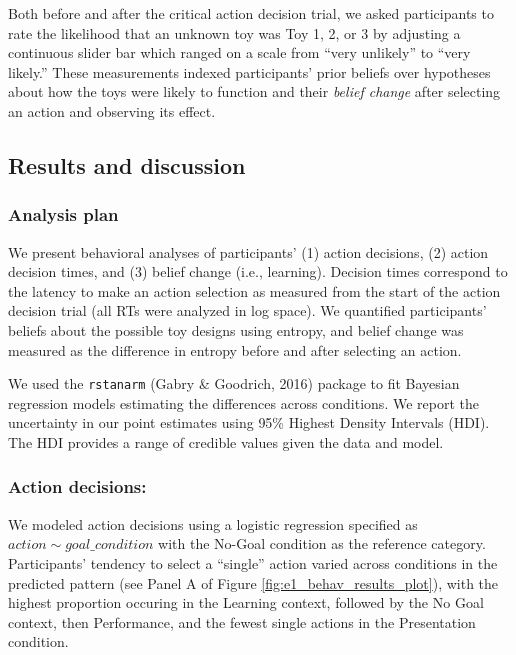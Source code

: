 \documentclass[10pt, letterpaper]{article}
\begin{document}
Both before and after the critical action decision trial, we asked
participants to rate the likelihood that an unknown toy was Toy 1, 2, or
3 by adjusting a continuous slider bar which ranged on a scale from
``very unlikely'' to ``very likely.'' These measurements indexed
participants' prior beliefs over hypotheses about how the toys were
likely to function and their \emph{belief change} after selecting an
action and observing its effect.

\subsection{Results and discussion}\label{results-and-discussion}

\subsubsection{Analysis plan}\label{analysis-plan}

We present behavioral analyses of participants' (1) action decisions,
(2) action decision times, and (3) belief change (i.e., learning).
Decision times correspond to the latency to make an action selection as
measured from the start of the action decision trial (all RTs were
analyzed in log space). We quantified participants' beliefs about the
possible toy designs using entropy, and belief change was measured as
the difference in entropy before and after selecting an action.

We used the \texttt{rstanarm} (Gabry \& Goodrich, 2016) package to fit
Bayesian regression models estimating the differences across conditions.
We report the uncertainty in our point estimates using 95\% Highest
Density Intervals (HDI). The HDI provides a range of credible values
given the data and model.

\subsubsection{Action decisions:}\label{action-decisions}

We modeled action decisions using a logistic regression specified as
\texttt{$action \sim goal\_condition$} with the No-Goal condition as the
reference category. Participants' tendency to select a ``single'' action
varied across conditions in the predicted pattern (see Panel A of Figure
\ref{fig:e1_behav_results_plot}), with the highest proportion occuring
in the Learning context, followed by the No Goal context, then
Performance, and the fewest single actions in the Presentation
condition.
\end{document}
